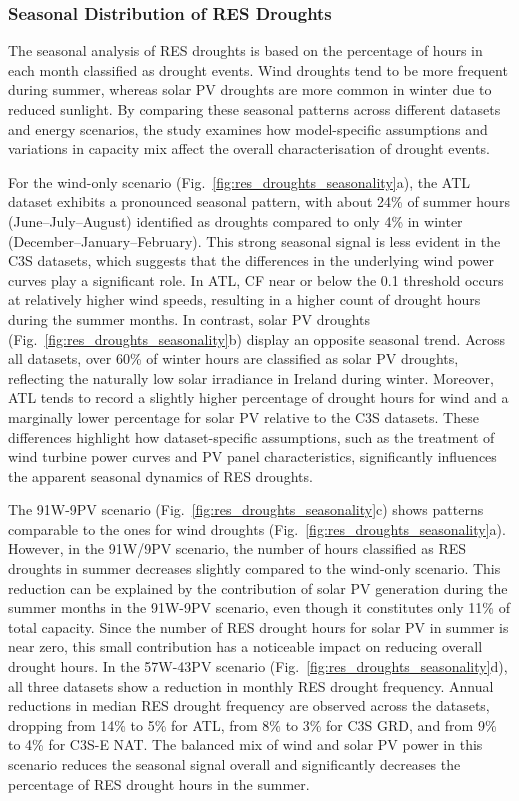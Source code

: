 \documentclass[preprint, 12pt]{elsarticle}
\begin{document}
\subsubsection{Seasonal Distribution of RES Droughts}

The seasonal analysis of RES droughts is based on the percentage of hours in each month classified as drought events. Wind droughts tend to be more frequent during summer, whereas solar PV droughts are more common in winter due to reduced sunlight. By comparing these seasonal patterns across different datasets and energy scenarios, the study examines how model-specific assumptions and variations in capacity mix affect the overall characterisation of drought events.

For the wind-only scenario (Fig.~\ref{fig:res_droughts_seasonality}a), the ATL dataset exhibits a pronounced seasonal pattern, with about 24\% of summer hours (June–July–August) identified as droughts compared to only 4\% in winter (December–January–February). This strong seasonal signal is less evident in the C3S datasets, which suggests that the differences in the underlying wind power curves play a significant role. In ATL, CF near or below the 0.1 threshold occurs at relatively higher wind speeds, resulting in a higher count of drought hours during the summer months. In contrast, solar PV droughts (Fig.~\ref{fig:res_droughts_seasonality}b) display an opposite seasonal trend. Across all datasets, over 60\% of winter hours are classified as solar PV droughts, reflecting the naturally low solar irradiance in Ireland during winter. Moreover, ATL tends to record a slightly higher percentage of drought hours for wind and a marginally lower percentage for solar PV relative to the C3S datasets. These differences highlight how dataset-specific assumptions, such as the treatment of wind turbine power curves and PV panel characteristics, significantly influences the apparent seasonal dynamics of RES droughts.

The 91W-9PV scenario (Fig.~\ref{fig:res_droughts_seasonality}c) shows patterns comparable to the ones for wind droughts (Fig.~\ref{fig:res_droughts_seasonality}a). However, in the 91W/9PV scenario, the number of hours classified as RES droughts in summer decreases slightly compared to the wind-only scenario. This reduction can be explained by the contribution of solar PV generation during the summer months in the 91W-9PV scenario, even though it constitutes only 11\% of total capacity. Since the number of RES drought hours for solar PV in summer is near zero, this small contribution has a noticeable impact on reducing overall drought hours. In the 57W-43PV scenario (Fig.~\ref{fig:res_droughts_seasonality}d), all three datasets show a reduction in monthly RES drought frequency. Annual reductions in median RES drought frequency are observed across the datasets, dropping from 14\% to 5\% for ATL, from 8\% to 3\% for C3S GRD, and from 9\% to 4\% for C3S-E NAT. The balanced mix of wind and solar PV power in this scenario reduces the seasonal signal overall and significantly decreases the percentage of RES drought hours in the summer.
\end{document}

